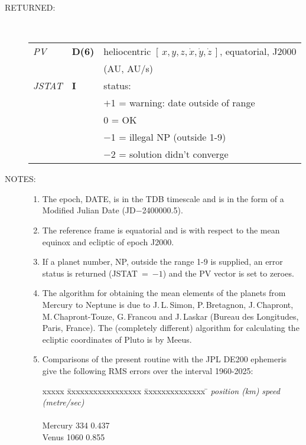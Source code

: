 \documentclass[11pt,twoside]{article}
\newcommand{\xyzxyzd}   {$[\,x,y,z,\dot{x},\dot{y},\dot{z}\,]$}
\newlength{\oldspacing}
\newcommand{\args}[2]
{
  \goodbreak
  \setlength{\oldspacing}{\topsep}
  \setlength{\topsep}{0.3ex}
  \begin{description}
  \item[#1]:\\[1.5ex]
    \begin{tabular}{p{7em}p{6em}p{22em}}
      #2
    \end{tabular}
  \end{description}
  \setlength{\topsep}{\oldspacing}
}
\renewcommand{\args}[2]
   {
     \begin{description}
        \item[#1:]\\
        \begin{tabular}{p{7em}p{6em}l}
           #2
        \end{tabular}
     \end{description}
   }
\newcommand{\spec}[3]
{
  {\em {#1}} & {\bf \mbox{#2}} & {#3}
}
\newcommand{\notes}[1]
{
  \goodbreak
  \setlength{\oldspacing}{\topsep}
  \setlength{\topsep}{0.3ex}
  \begin{description}
    \item[NOTES]:
        #1
  \end{description}
  \setlength{\topsep}{\oldspacing}
}
\renewcommand{\notes}[1]
   {
      \begin{description}
         \item[NOTES:]
            #1
      \end{description}
   }
\begin{document}
\args{RETURNED}
{
 \spec{PV}{D(6)}{heliocentric \xyzxyzd, equatorial, J2000} \\
 \spec{}{}{\hspace{1.5em} (AU, AU/s)} \\
 \spec{JSTAT}{I}{status:} \\
 \spec{}{}{\hspace{1.5em} $+$1 = warning: date outside of range} \\
 \spec{}{}{\hspace{2.3em}    0 = OK} \\
 \spec{}{}{\hspace{1.5em} $-$1 = illegal NP (outside 1-9)} \\
 \spec{}{}{\hspace{1.5em} $-$2 = solution didn't converge}
}
\notes
{
 \begin{enumerate}
  \item The epoch, DATE, is in the TDB timescale and is in the form
        of a Modified Julian Date (JD$-$2400000.5).
  \item The reference frame is equatorial and is with respect to
        the mean equinox and ecliptic of epoch J2000.
  \item If a planet number, NP, outside the range 1-9 is supplied, an error
        status is returned (JSTAT~=~$-1$) and the PV vector
        is set to zeroes.
  \item The algorithm for obtaining the mean elements of the
        planets from Mercury to Neptune is due to
        J.\,L.\,Simon, P.\,Bretagnon, J.\,Chapront,
        M.\,Chapront-Touze, G.\,Francou and J.\,Laskar (Bureau des
        Longitudes, Paris, France).  The (completely different)
        algorithm for calculating the ecliptic coordinates of
        Pluto is by Meeus.
  \item Comparisons of the present routine with the JPL DE200 ephemeris
        give the following RMS errors over the interval 1960-2025:
        \begin{tabbing}
         xxxxx \= xxxxxxxxxxxxxxxxx \= xxxxxxxxxxxxxx \= \kill
         \> \> {\it position (km)} \> {\it speed (metre/sec)} \\ \\
         \> Mercury \> \hspace{2em}334 \> \hspace{2.5em}0.437 \\
         \> Venus   \> \hspace{1.5em}1060 \> \hspace{2.5em}0.855 \\

\end{tabbing}
\end{enumerate}}
\end{document}
